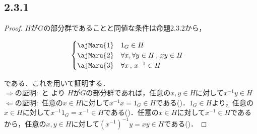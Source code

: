 \documentclass[uplatex,dvipdfmx,a4paper,11pt]{jsarticle}
\newenvironment{tleftbar}{\begin{tbleftline}\setlength{\parindent}{1zw}}{\end{tbleftline}}
\begin{document}
\subsection*{2.3.1}
\begin{tleftbar}
\begin{proof}
        $H$が$G$の部分群であることと同値な条件は命題2.3.2から，
        \begin{fleqn}[30pt]
            \begin{align*}
                \begin{cases}
                    \text{\ajMaru{1}}\quad  1_G\in H\\
                    \text{\ajMaru{2}}\quad \forall x,\forall y\in H\,,\,xy\in H\\
                    \text{\ajMaru{3}}\quad \forall x\,,\, x^{-1}\in H
                \end{cases}
            \end{align*}
        \end{fleqn}
        である．これを用いて証明する．\\
        $\Longrightarrow$の証明$\colon$  と より $H$が$G$の部分群であれば，任意の$x,y\in H$に対して$x^{-1}y\in H$\\
        $\Longleftarrow$の証明$\colon$ 任意の$x\in H$に対して$x^{-1}x=1_G\in H$である()．$1_G \in H$より，任意の$x\in H$に対して$x^{-1}1_G=x^{-1}\in H$である()．任意の$x\in H$に対して$x^{-1}\in H$であるから，任意の$x,y\in H$に対して$(x^{-1})^{-1}y=xy\in H$である()．
\end{proof}
\end{tleftbar}
\end{document}
